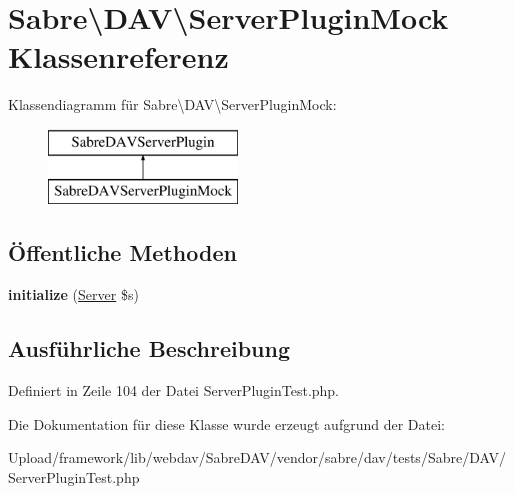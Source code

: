 \hypertarget{class_sabre_1_1_d_a_v_1_1_server_plugin_mock}{}\section{Sabre\textbackslash{}D\+AV\textbackslash{}Server\+Plugin\+Mock Klassenreferenz}
\label{class_sabre_1_1_d_a_v_1_1_server_plugin_mock}
Klassendiagramm für Sabre\textbackslash{}D\+AV\textbackslash{}Server\+Plugin\+Mock\+:\begin{figure}[H]
\begin{center}
\leavevmode
\includegraphics[height=2.000000cm]{class_sabre_1_1_d_a_v_1_1_server_plugin_mock}
\end{center}
\end{figure}
\subsection*{Öffentliche Methoden}
\begin{DoxyCompactItemize}
\item 
\mbox{\label{class_sabre_1_1_d_a_v_1_1_server_plugin_mock_ad1ea6122e414263d90975f0ed31fa563}} 
{\bfseries initialize} (\mbox{\hyperlink{class_sabre_1_1_d_a_v_1_1_server}{Server}} \$s)
\end{DoxyCompactItemize}


\subsection{Ausführliche Beschreibung}


Definiert in Zeile 104 der Datei Server\+Plugin\+Test.\+php.



Die Dokumentation für diese Klasse wurde erzeugt aufgrund der Datei\+:\begin{DoxyCompactItemize}
\item 
Upload/framework/lib/webdav/\+Sabre\+D\+A\+V/vendor/sabre/dav/tests/\+Sabre/\+D\+A\+V/Server\+Plugin\+Test.\+php\end{DoxyCompactItemize}
